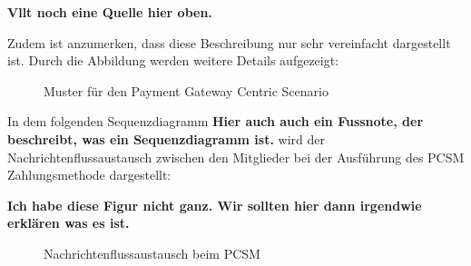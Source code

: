 \textbf{Vllt noch eine Quelle hier oben.}


Zudem ist anzumerken, dass diese Beschreibung nur sehr vereinfacht dargestellt ist. Durch die 
\cite{refart:JTAS} Abbildung werden weitere Details aufgezeigt: 

\begin{figure}[H]
    \caption{Muster für den Payment Gateway Centric Scenario\cite{refart:JTAS}}
    \label{fig:refart:JTAS}
\end{figure}

In dem folgenden Sequenzdiagramm \textbf{Hier auch auch ein Fussnote, der beschreibt, was ein Sequenzdiagramm ist.}
wird der Nachrichtenflussaustausch zwischen den Mitglieder bei der Ausführung des PCSM Zahlungsmethode dargestellt:


\textbf{Ich habe diese Figur nicht ganz. Wir sollten hier dann irgendwie erklären was es ist.}

\begin{figure}[H]
    \caption{Nachrichtenflussaustausch beim PCSM \cite{refart:JTAS}}
    \label{fig:refart:JTAS_2}
\end{figure}


